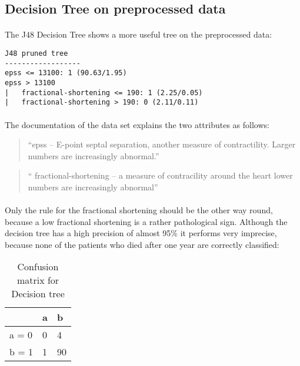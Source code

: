 \documentclass[paper=a4, fontsize=11pt]{scrartcl} %
\numberwithin{equation}{section} %
\numberwithin{figure}{section} %
\numberwithin{table}{section} %
\begin{document}
\subsection{Decision Tree on preprocessed data}

\paragraph{}The J48 Decision Tree shows a more useful tree on the preprocessed data:

\begin{lstlisting}
J48 pruned tree
------------------
epss <= 13100: 1 (90.63/1.95)
epss > 13100
|   fractional-shortening <= 190: 1 (2.25/0.05)
|   fractional-shortening > 190: 0 (2.11/0.11)
\end{lstlisting}

\paragraph{}The documentation of the data set explains the two attributes as follows:
\begin{quote}
``epss -- E-point septal separation, another measure of contractility. Larger numbers are increasingly abnormal.''
\end{quote}
\begin{quote}
`` fractional-shortening -- a measure of contracility around the heart lower numbers are increasingly abnormal''
\end{quote}

\paragraph{}Only the rule for the fractional shortening should be the other way round, because a low fractional shortening is a rather pathological sign. Although the decision tree has a high precision of almost 95\% it performs very imprecise, because none of the patients who died after one year are correctly classified:

\begin{table}[h]
\centering
\begin{tabular}{|l|ll|}
\hline
 & a &	b \\
\hline
a = 0  & 0 & 4 	\\
b = 1 & 1 & 90 	\\
\hline
\end{tabular}
\caption{Confusion matrix for Decision tree}
\end{table}
\end{document}
